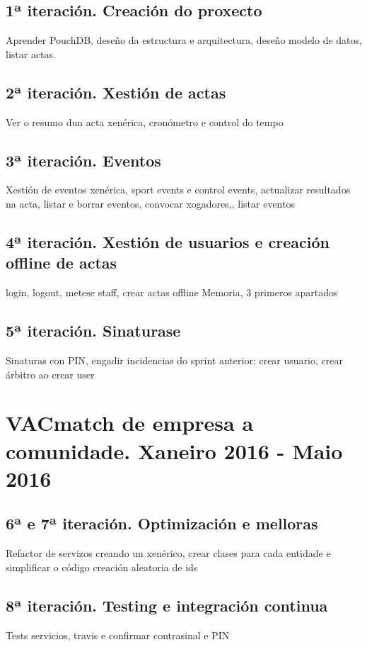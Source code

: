     \subsection{1ª iteración. Creación do proxecto}
    Aprender PouchDB, deseño da estructura e arquitectura, deseño modelo de datos, listar 
  actas.

    \subsection{2ª iteración. Xestión de actas}
    Ver o resumo dun acta xenérica, cronómetro e control do tempo 

    \subsection{3ª iteración. Eventos}
    Xestión de eventos xenérica, sport events e control events, actualizar resultados na 
  acta, listar e borrar eventos, convocar xogadores,, listar eventos

    \subsection{4ª iteración. Xestión de usuarios e creación offline de actas}
    login, logout, metese staff, crear actas offline
    Memoria, 3 primeros apartados

    \subsection{5ª iteración. Sinaturase}
    Sinaturas con PIN, engadir incidencias
    do sprint anterior: crear usuario, crear árbitro ao crear user

  \section{VACmatch de empresa a comunidade. Xaneiro 2016 - Maio 2016}
    \subsection{6ª e 7ª iteración. Optimización e melloras}
    Refactor de servizos creando un xenérico, crear clases para cada entidade e simplificar o código
    creación aleatoria de ids

    \subsection{8ª iteración. Testing e integración continua}
    Tests servicios, travis e confirmar contrasinal e PIN

